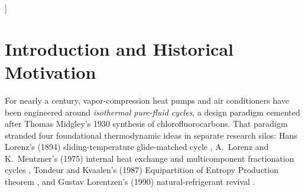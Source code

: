 \documentclass[twocolumn,10pt]{article}
\begin{document}
\begin{@twocolumnfalse}
\begin{abstract}
\begin{enumerate}
        \item \textbf{Regime B ($100\;\text{kW}_{\text{th}}$ Industrial Waste-Heat Recovery at $90/110/135\,^\circ\text{C}$, fixed $18.0\;\text{m}^2$ AISI 316L BPHE, $P_{\text{suc}}\ge 1.05\;\text{bar}$ ATEX guard):} Under counterflow sensible glides ($55\text{--}75\;\text{K}$ sink, $25\text{--}35\;\text{K}$ source), single-stage natural zeotropes decisively beat autoresearch-optimized two-stage PFAS \texttt{R-1233zd(E)} ceilings. For factory-sealed hermetic skids, \texttt{CO2/R-600} ($19\text{--}23\%/77\text{--}81\%$) exploits \emph{isenthalpic flash-gas glide skipping} to achieve $\text{COP}=4.731$ ($+32.6\%$) at $110\,^\circ\text{C}$ and $4.420$ ($+30.3\%$) at $135\,^\circ\text{C}$ ($46.4\text{--}46.7\%$ Lorenz efficiency), cutting LCOH to $\$32.02\text{--}\$32.49/\text{MWh}_{\text{th}}$ ($-28\%$ vs.\ PFAS \texttt{R-1233zd(E)}). For field-serviceable skids, matched-volatility hydrocarbon zeotropes (\texttt{R-290/R-601a 48/52} at $90\,^\circ\text{C}$; \texttt{R-290/R-601 55/45} at $110\,^\circ\text{C}$; \texttt{R-290/R-601 72/28} at $135\,^\circ\text{C}$) deliver $\text{COP}=5.327$ ($+26.1\%$), $4.076$ ($+14.2\%$), and $4.140$ ($+22.1\%$), with $<1\%$ agreement against SINTEF \texttt{ThermoPack} PC-SAFT, $100\%$ win rates across $64$ correlated Monte Carlo draws, and $-2.8\%$ to $+0.6\%$ COP shift after a $20\%$ Rayleigh vapor leak while staying strictly above atmospheric pressure ($2.25\text{--}7.16\;\text{bar}$).
      \end{enumerate}
      \vspace{0.6em}
      \noindent\textbf{Keywords:} Natural zeotropic refrigerants; Lorenz cycle; Microchannel heat exchangers; Brazed plate heat exchangers; Industrial high-temperature heat pumps; Multi-layer co-design; Zero-PFAS; Autonomous research.
    \end{abstract}
    \vspace{0.8em}
  \end{@twocolumnfalse}
]

\section{Introduction and Historical Motivation}

For nearly a century, vapor-compression heat pumps and air conditioners have been engineered around \emph{isothermal pure-fluid cycles}, a design paradigm cemented after Thomas Midgley's 1930 synthesis of chlorofluorocarbons. That paradigm stranded four foundational thermodynamic ideas in separate research silos: Hans Lorenz's (1894) sliding-temperature glide-matched cycle \citep{lorenz1894}, A.~Lorenz and K.~Meutzner's (1975) internal heat exchange and multicomponent fractionation cycles \citep{lorenz1975meutzner}, Tondeur and Kvaalen's (1987) Equipartition of Entropy Production theorem \citep{tondeur1987kvaalen}, and Gustav Lorentzen's (1990) natural-refrigerant revival \citep{lorentzen1990}.
\end{document}
